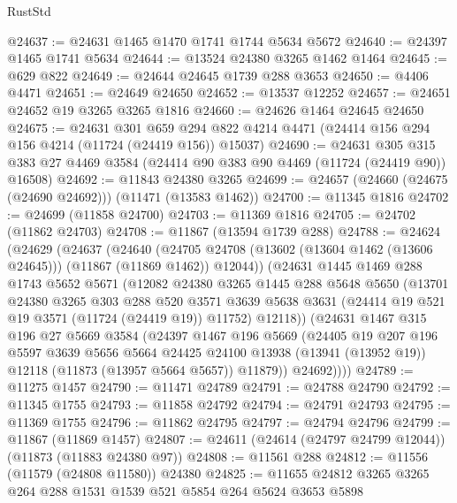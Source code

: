 \begin{lexlean}{RustStd}
\begin{coremodule}
@24637 := @24631 @1465 @1470 @1741 @1744 @5634 @5672
@24640 := @24397 @1465 @1741 @5634
@24644 := @13524 @24380 @3265 @1462 @1464
@24645 := @629 @822
@24649 := @24644 @24645 @1739 @288 @3653
@24650 := @4406 @4471
@24651 := @24649 @24650
@24652 := @13537 @12252
@24657 := @24651 @24652 @19 @3265 @3265 @1816
@24660 := @24626 @1464 @24645 @24650
@24675 := @24631
    @301
    @659
    @294
    @822
    @4214
    @4471
    (@24414 @156 @294 @156 @4214 (@11724 (@24419 @156)) @15037)
@24690 := @24631
    @305
    @315
    @383
    @27
    @4469
    @3584
    (@24414 @90 @383 @90 @4469 (@11724 (@24419 @90)) @16508)
@24692 := @11843 @24380 @3265
@24699 := @24657 (@24660 (@24675 (@24690 @24692))) (@11471 (@13583 @1462))
@24700 := @11345 @1816
@24702 := @24699 (@11858 @24700)
@24703 := @11369 @1816
@24705 := @24702 (@11862 @24703)
@24708 := @11867 (@13594 @1739 @288)
@24788 := @24624
    (@24629
      (@24637
        (@24640
          (@24705 @24708 (@13602 (@13604 @1462 (@13606 @24645))) (@11867 (@11869 @1462)) @12044))
        (@24631
          @1445
          @1469
          @288
          @1743
          @5652
          @5671
          (@12082
            @24380
            @3265
            @1445
            @288
            @5648
            @5650
            (@13701
              @24380
              @3265
              @303
              @288
              @520
              @3571
              @3639
              @5638
              @3631
              (@24414 @19 @521 @19 @3571 (@11724 (@24419 @19)) @11752)
              @12118))
          (@24631
            @1467
            @315
            @196
            @27
            @5669
            @3584
            (@24397
              @1467
              @196
              @5669
              (@24405
                @19
                @207
                @196
                @5597
                @3639
                @5656
                @5664
                @24425
                @24100
                @13938
                (@13941 (@13952 @19))
                @12118
                (@11873 (@13957 @5664 @5657))
                @11879))
            @24692))))
@24789 := @11275 @1457
@24790 := @11471 @24789
@24791 := @24788 @24790
@24792 := @11345 @1755
@24793 := @11858 @24792
@24794 := @24791 @24793
@24795 := @11369 @1755
@24796 := @11862 @24795
@24797 := @24794 @24796
@24799 := @11867 (@11869 @1457)
@24807 := @24611 (@24614 (@24797 @24799 @12044)) (@11873 (@11883 @24380 @97))
@24808 := @11561 @288
@24812 := @11556 (@11579 (@24808 @11580)) @24380
@24825 := @11655 @24812 @3265 @3265 @264 @288 @1531 @1539 @521 @5854 @264 @5624 @3653 @5898

\end{coremodule}
\end{lexlean}
